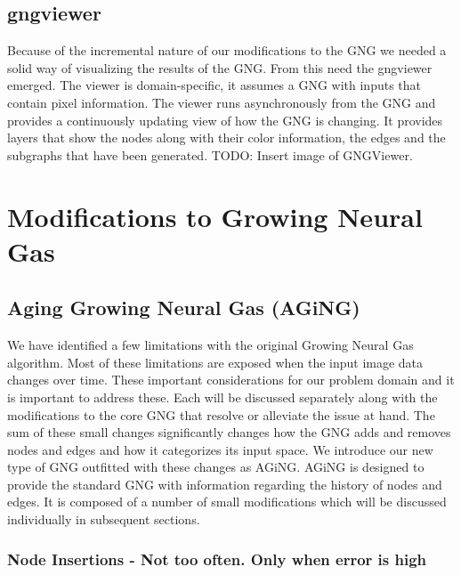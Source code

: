 \documentclass{article}
\renewcommand{\|}{\origbar} %
\begin{document}

\subsection{gngviewer}

Because of the incremental nature of our modifications to the GNG we needed a solid way of visualizing the results of the GNG. From this need the gngviewer emerged. The viewer is domain-specific, it assumes a GNG with inputs that contain pixel information. The viewer runs asynchronously from the GNG and provides a continuously updating view of how the GNG is changing. It provides layers that show the nodes along with their color information, the edges and the subgraphs that have been generated. TODO: Insert image of GNGViewer.


\section{Modifications to Growing Neural Gas}

\subsection{Aging Growing Neural Gas (AGiNG)}

We have identified a few limitations with the original Growing Neural Gas algorithm. Most of these limitations are exposed when the input image data changes over time. These important considerations for our problem domain and it is important to address these. Each will be discussed separately along with the modifications to the core GNG that resolve or alleviate the issue at hand. The sum of these small changes significantly changes how the GNG adds and removes nodes and edges and how it categorizes its input space. We introduce our new type of GNG outfitted with these changes as AGiNG. AGiNG is designed to provide the standard GNG with information regarding the history of nodes and edges. It is composed of a number of small modifications which will be discussed individually in subsequent sections.

\subsubsection{Node Insertions - Not too often. Only when error is high}
\end{document}
